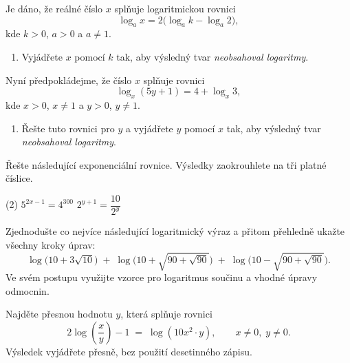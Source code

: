 \documentclass[12pt,a4paper]{article}
\begin{document}
\begin{exercise}
Je dáno, že reálné číslo $x$ splňuje logaritmickou rovnici
\[
    \log_{a} x = 2\bigl(\log_{a} k - \log_{a} 2\bigr),
\]
kde $k>0$, $a>0$ a $a \neq 1$.

\begin{enumerate}[label=\alph*)]
    \item Vyjádřete $x$ pomocí $k$ tak, aby výsledný tvar \emph{neobsahoval logaritmy}.
\end{enumerate}

Nyní předpokládejme, že číslo $x$ splňuje rovnici
\[
    \log_{x} (5y + 1) = 4 + \log_{x} 3,
\]
kde $x>0$, $x \neq 1$ a $y>0$, $y \neq 1$.

\begin{enumerate}[label=\alph*),start=2]
    \item Řešte tuto rovnici pro $y$ a vyjádřete $y$ pomocí $x$ tak, aby výsledný tvar \emph{neobsahoval logaritmy}.
\end{enumerate}
\end{exercise}


\begin{exercise}
    Řešte následující exponenciální rovnice. Výsledky zaokrouhlete na tři platné číslice.
    \begin{tasks}(2)
        \task $5^{2x - 1} = 4^{300}$
        \task $2^{y+1} = \dfrac{10}{2^{y}}$
    \end{tasks}
\end{exercise}


\begin{exercise}
    Zjednodušte co nejvíce následující logaritmický výraz a přitom přehledně ukažte všechny kroky úprav:
    \[
        \log\bigl(10 + 3\sqrt{10}\bigr)
        \;+\;
        \log\bigl(10 + \sqrt{90 + \sqrt{90}}\bigr)
        \;+\;
        \log\bigl(10 - \sqrt{90 + \sqrt{90}}\bigr).
    \]
    Ve svém postupu využijte vzorce pro logaritmus součinu a vhodné úpravy odmocnin.
\end{exercise}


\begin{exercise}
    Najděte přesnou hodnotu $y$, která splňuje rovnici
    \[
        2\log\!\left(\frac{x}{y}\right) - 1
        \;=\;
        \log\!\left(10x^{2} \cdot y\right),
        \qquad x \ne 0,\; y \ne 0.
    \]
    Výsledek vyjádřete přesně, bez použití desetinného zápisu.
\end{exercise}
\end{document}

